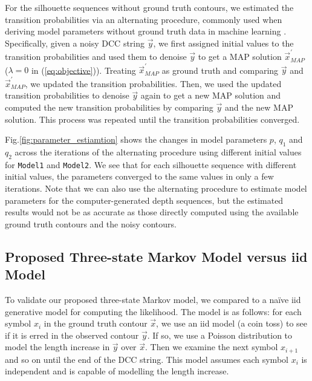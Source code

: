 For the silhouette sequences without ground truth contours, we estimated the transition probabilities via an alternating procedure, commonly used when deriving model parameters without ground truth data in machine learning \cite{mackay2003example,sundberg1976iterative}. 
Specifically, given a noisy DCC string $\vec{y}$, we first assigned initial values to the transition probabilities and used them to denoise $\vec{y}$ to get a MAP solution $\vec{x}_{MAP}^{\prime}$ ($\lambda=0$ in (\ref{eq:objective})).
Treating $\vec{x}_{MAP}^{\prime}$ as ground truth and comparing $\vec{y}$ and $\vec{x}_{MAP}^{\prime}$, we updated the transition probabilities.
Then, we used the updated transition probabilities to denoise $\vec{y}$ again to get a new MAP solution and computed the new transition probabilities by comparing $\vec{y}$ and the new MAP solution.
This process was repeated until the transition probabilities converged.

Fig.\;\ref{fig:parameter_estiamtion} shows the changes in model parameters $p$, $q_1$ and $q_2$ across the iterations of the alternating procedure using different initial values for \texttt{Model1} and \texttt{Model2}.
We see that for each silhouette sequence with different initial values, the parameters converged to the same values in only a few iterations.
Note that we can also use the alternating procedure to estimate model parameters for the computer-generated depth sequences, but the estimated results would not be as accurate as those  directly computed using the available ground truth contours and the noisy contours.

\subsection{Proposed Three-state Markov Model versus iid Model}
\label{subsec:vs_iid_model}

To validate our proposed three-state Markov model, we compared to a na\"ive iid generative model for computing the likelihood.
The model is as follows: for each symbol $x_i$ in the ground truth contour $\vec{x}$, we use an iid model (a coin toss) to see if it is erred in the observed contour $\vec{y}$.
If so, we use a Poisson distribution to model the length increase in $\vec{y}$ over $\vec{x}$.
Then we examine the next symbol $x_{i+1}$ and so on until the end of the DCC string.
This model assumes each symbol $x_i$ is independent and is capable of modelling the length increase.

